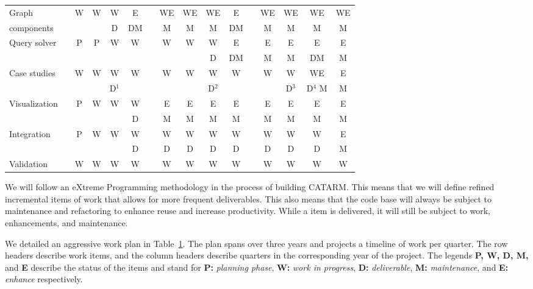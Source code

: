 \documentclass[12pt]{article}
\begin{document}
\begin{table}[bt]
\begin{tabular}{lp{.1cm}ccccp{.1cm}ccccp{.1cm}cccc}
Graph  & & 
W & W & W & E & & WE & WE & WE & E & & WE & WE & WE & WE \\ 
components & & 
 &  & D & DM & & M & M & M & DM & & M & M & M & M \\ \hline

\multirow{2}{*}{Query solver} & & 
P & P & W & W & & W & W & W & E & & E & E & E & E \\ 
& & 
 &  &  &  & &  &  & D & DM & & M & M & DM & M \\ \hline

\multirow{2}{*}{Case studies} & & 
W & W & W & W & & W & W & W & W & & W & W & WE & E \\ 
& & 
 &  & D$^1$ &  & &  &  & D$^2$ &  & &  & D$^3$ & D$^4$ M & M \\ \hline

\multirow{2}{*}{Visualization} & & 
P & W & W & W & & E & E & E & E & & E & E & E & E \\ 
& & 
 &  &  & D & & M & M & M & M & & M & M & M & M \\ \hline

\multirow{2}{*}{Integration} & & 
P & W & W & W & & W & W & W & W & & W & W & W & E \\ 
& & 
 &  &  & D & & D & D & D & D & & D & D & D & M \\  \hline

Validation & & 
W & W & W & W & & W & W & W & W & & W & W & W & W \\  \bottomrule
\end{tabular}
\normalsize
\label{t:workplan}
\end{table}

We will follow an eXtreme Programming 
methodology in the process of building CATARM.
This means that we will define refined incremental items of 
work that allows for more frequent deliverables. 
This also means that the code base will always be subject
to maintenance and refactoring to enhance reuse and 
increase productivity. 
While a item is delivered, it will still be subject to work,
enhancements, and maintenance. 

We detailed an aggressive work plan in Table~\ref{t:workplan}. 
The plan spans over three years and projects a timeline
of work per quarter. 
The row headers describe work items, and the column headers
describe quarters in the corresponding year of the project.
The legends {\bf P, W, D, M, } 
and {\bf E} 
describe the status of the items 
and stand for 
{\bf P:} {\em planning phase}, 
{\bf W:} {\em work in progress}, 
{\bf D:} {\em deliverable}, 
{\bf M:}  {\em maintenance}, 
and 
{\bf E: } {\em enhance} respectively. 
\end{document}
